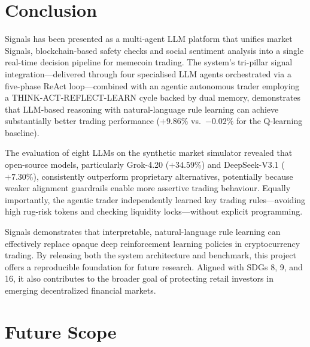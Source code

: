 \documentclass[12pt,a4paper,oneside,openany]{book}
\begin{document}
\begin{itemize}[leftmargin=8mm]
\begin{enumerate}[leftmargin=12mm]
\end{enumerate}

\chapter{Conclusion}
\label{ch:conclusion}

Signals has been presented as a multi-agent LLM platform that unifies market Signals, blockchain-based safety checks and social sentiment analysis into a single real-time decision pipeline for memecoin trading. The system's tri-pillar signal integration---delivered through four specialised LLM agents orchestrated via a five-phase ReAct loop---combined with an agentic autonomous trader employing a THINK-ACT-REFLECT-LEARN cycle backed by dual memory, demonstrates that LLM-based reasoning with natural-language rule learning can achieve substantially better trading performance ($+9.86\%$ vs.\ $-0.02\%$ for the Q-learning baseline).

The evaluation of eight LLMs on the synthetic market simulator revealed that open-source models, particularly Grok-4.20 ($+34.59\%$) and DeepSeek-V3.1 ($+7.30\%$), consistently outperform proprietary alternatives, potentially because weaker alignment guardrails enable more assertive trading behaviour. Equally importantly, the agentic trader independently learned key trading rules—avoiding high rug-risk tokens and checking liquidity locks—without explicit programming.

Signals demonstrates that interpretable, natural-language rule learning can effectively replace opaque deep reinforcement learning policies in cryptocurrency trading. By releasing both the system architecture and benchmark, this project offers a reproducible foundation for future research. Aligned with SDGs 8, 9, and 16, it also contributes to the broader goal of protecting retail investors in emerging decentralized financial markets.

\chapter{Future Scope}
\label{ch:future}


\end{itemize}
\end{document}
